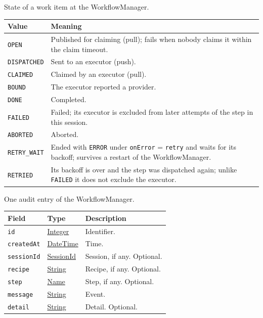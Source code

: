 \documentclass[a4paper]{arrowhead}
\newcommand{\pref}[1]{{\textcolor{ArrowheadGrey}{\hyperref[sec:model:primitives:#1]{#1}}}}
\begin{document}
State of a work item at the WorkflowManager.

{\small
\begin{longtable}{|p{3.9cm}|p{11.9cm}|}

\hline
\rowcolor{gray!33} Value & Meaning \\ \hline
\endhead
\texttt{OPEN} & Published for claiming (pull); fails when nobody claims it within the claim timeout. \\ \hline
\texttt{DISPATCHED} & Sent to an executor (push). \\ \hline
\texttt{CLAIMED} & Claimed by an executor (pull). \\ \hline
\texttt{BOUND} & The executor reported a provider. \\ \hline
\texttt{DONE} & Completed. \\ \hline
\texttt{FAILED} & Failed; its executor is excluded from later attempts of the step in this session. \\ \hline
\texttt{ABORTED} & Aborted. \\ \hline
\texttt{RETRY\_WAIT} & Ended with \texttt{ERROR} under \texttt{onError} = \texttt{retry} and waits for its backoff; survives a restart of the WorkflowManager. \\ \hline
\texttt{RETRIED} & Its backoff is over and the step was dispatched again; unlike \texttt{FAILED} it does not exclude the executor. \\ \hline
\end{longtable}
}

One audit entry of the WorkflowManager.

{\small
\begin{longtable}{|p{3.9cm}|p{4.4cm}|p{7.5cm}|}

\hline
\rowcolor{gray!33} Field & Type & Description \\ \hline
\endhead
\texttt{id} & \pref{Integer} & Identifier. \\ \hline
\texttt{createdAt} & \pref{DateTime} & Time. \\ \hline
\texttt{sessionId} & \pref{SessionId} & Session, if any. Optional. \\ \hline
\texttt{recipe} & \pref{String} & Recipe, if any. Optional. \\ \hline
\texttt{step} & \pref{Name} & Step, if any. Optional. \\ \hline
\texttt{message} & \pref{String} & Event. \\ \hline
\texttt{detail} & \pref{String} & Detail. Optional. \\ \hline
\end{longtable}
}
\end{document}

